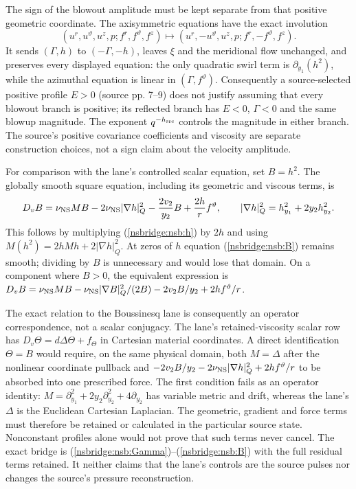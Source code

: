 \documentclass[11pt]{article}
\begin{document}
The sign of the blowout amplitude must be kept separate from that positive
geometric coordinate. The axisymmetric equations have the exact involution
\[
 (u^r,u^\vartheta,u^z,p;f^r,f^\vartheta,f^z)
 \longmapsto
 (u^r,-u^\vartheta,u^z,p;f^r,-f^\vartheta,f^z).
 \label{nsbridge:nsb:sign}
\]
It sends $(\Gamma,h)$ to $(-\Gamma,-h)$, leaves $\xi$ and the meridional
flow unchanged, and preserves every displayed equation: the only quadratic
swirl term is $\partial_{y_1}(h^2)$, while the azimuthal equation is linear in
$(\Gamma,f^\vartheta)$. Consequently a source-selected positive profile
$E>0$ (source pp. 7--9) does not justify assuming that every blowout branch is
positive; its reflected branch has $E<0$, $\Gamma<0$ and the same blowup
magnitude. The exponent $q^{-h_{\rm src}}$ controls the magnitude in either
branch. The source's positive covariance coefficients and viscosity are
separate construction choices, not a sign claim about the velocity amplitude.

For comparison with the lane's controlled scalar equation, set
$B=h^2$. The globally smooth square equation, including its geometric and
viscous terms, is
\begin{equation}
 D_vB=\nu_{\rm NS}MB-2\nu_{\rm NS}
 |\nabla h|_Q^2-\frac{2v_2}{y_2}B+\frac{2h}{r}f^\vartheta,
 \qquad |\nabla h|_Q^2=h_{y_1}^2+2y_2h_{y_2}^2.
 \label{nsbridge:nsb:B}
\end{equation}
This follows by multiplying (\ref{nsbridge:nsb:h}) by $2h$ and using
$M(h^2)=2hMh+2|\nabla h|_Q^2$. At zeros of $h$ equation
(\ref{nsbridge:nsb:B}) remains smooth; dividing by $B$ is unnecessary and would lose
that domain. On a component where $B>0$, the equivalent expression is
$D_vB=\nu_{\rm NS}MB-\nu_{\rm NS}|\nabla B|_Q^2/(2B)
-2v_2B/y_2+2hf^\vartheta/r$.

The exact relation to the Boussinesq lane is consequently an operator
correspondence, not a scalar conjugacy. The lane's retained-viscosity scalar
row has $D_v\Theta=d\Delta\Theta+f_\Theta$ in Cartesian material
coordinates. A direct identification $\Theta=B$ would require, on the same
physical domain, both $M=\Delta$ after the nonlinear coordinate pullback and
$-2v_2B/y_2-2\nu_{\rm NS}|\nabla h|_Q^2+2hf^\vartheta/r$ to be absorbed into
one prescribed force. The first condition fails as an operator identity:
$M=\partial_{y_1}^2+2y_2\partial_{y_2}^2+4\partial_{y_2}$ has variable metric
and drift, whereas the lane's $\Delta$ is the Euclidean Cartesian Laplacian.
The geometric, gradient and force terms must therefore be retained or
calculated in the particular source state. Nonconstant profiles alone
would not prove that such terms never cancel.
The exact bridge is (\ref{nsbridge:nsb:Gamma})--(\ref{nsbridge:nsb:B}) with the
full residual terms retained. It neither claims that the lane's controls are
the source pulses nor changes the source's pressure reconstruction.
\end{document}
